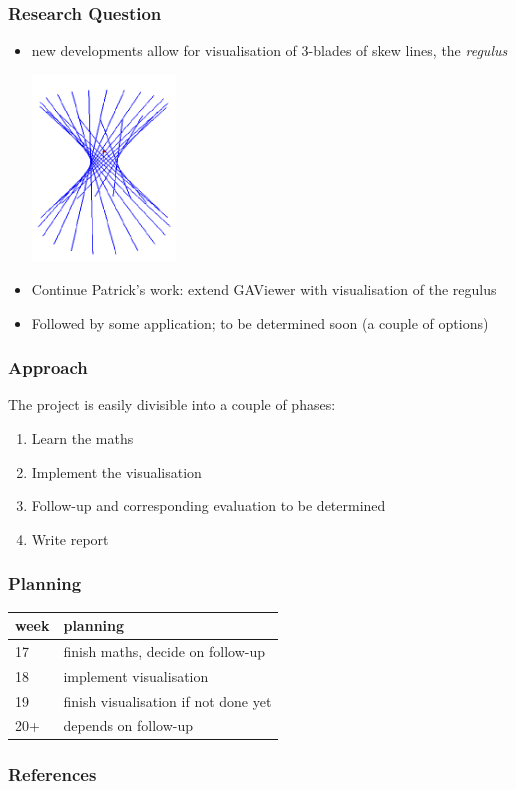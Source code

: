 \documentclass{beamer}
\begin{document}
  \begin{frame}
    \frametitle{Research Question}
    \begin{itemize}
      \item new developments allow for visualisation of 3-blades of skew lines,
        the \emph{regulus}
        \begin{center}
          \includegraphics[width=0.3\textwidth]{regulus.png}
        \end{center}
      \item Continue Patrick's work: extend GAViewer with visualisation of the
        regulus
      \item Followed by some application; to be determined soon (a couple of
        options)
    \end{itemize}
  \end{frame}

  \begin{frame}
    \frametitle{Approach}
    The project is easily divisible into a couple of phases:
    \begin{enumerate}
      \item Learn the maths
      \item Implement the visualisation
      \item Follow-up and corresponding evaluation to be determined
      \item Write report
    \end{enumerate}
  \end{frame}

  \begin{frame}
    \frametitle{Planning}
    \begin{table}
      \begin{tabular}{| l | l |}
        \hline
        week & planning \\
        \hline
        17   & finish maths, decide on follow-up \\
        18   & implement visualisation \\
        19   & finish visualisation if not done yet \\
        20+  & depends on follow-up \\
        \hline
      \end{tabular}
    \end{table}
  \end{frame}


\begin{frame}
  \frametitle{References}
  
\end{frame}
\end{document}
